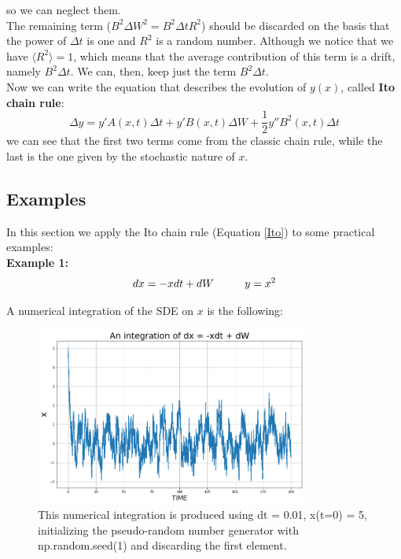  so we can neglect them.\\
 The remaining term ($B^2\Delta W^2 =B^2\Delta t R^2$) should be discarded on the basis that the power of $\Delta t$ is one and $R^2$ is a random number. Although we notice that we have $\langle R^2 \rangle = 1$, which means that the average contribution of this term is a drift, namely $B^2 \Delta t$. We can, then, keep just the term $B^2\Delta t$.\\
 Now we can write the equation that describes the evolution of $y(x)$, called \textbf{Ito chain rule}:
 \begin{equation}
 \Delta y = y'A(x,t)\Delta t + y'B(x,t)\Delta W + \frac{1}{2}y''B^2(x,t)\Delta t
     \label{Ito}
 \end{equation}
 we can see that the first two terms come from the classic chain rule, while the last is the one given by the stochastic nature of $x$.
 

 \subsection{Examples}
 
In this section we apply the Ito chain rule (Equation \ref{Ito}) to some practical examples: \\

\textbf{Example 1:} \begin{equation}
    dx = -xdt + dW \hspace{10mm} y = x^2
    \label{SDE_x_1}
\end{equation}

A numerical integration of the SDE on $x$ is the following:
\begin{figure}[H]
  \centering
  \includegraphics[width=0.8\textwidth]{SDE/Figures/SDEx.png}
  \caption{This numerical integration is produced using dt = 0.01, x(t=0) = 5, initializing the pseudo-random number generator with np.random.seed(1) and discarding the first element.} 
  \label{Fig:SDE_x_1}
\end{figure}

